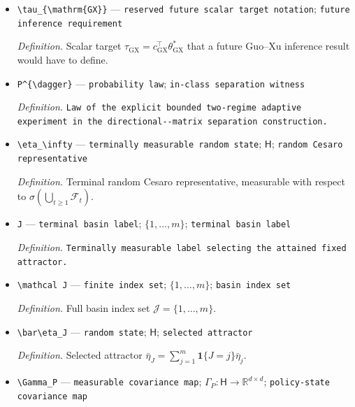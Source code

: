 \documentclass{article}
\begin{document}
\begin{itemize}
  \item \texttt{\textbackslash{}\allowbreak{}tau\_\allowbreak{}\{\textbackslash{}\allowbreak{}mathrm\{GX\}\allowbreak{}\}\allowbreak{}} --- \texttt{reserved future scalar target notation}; \texttt{future inference requirement}
  \par\smallskip\noindent\emph{Definition.} Scalar target \(\tau_{\mathrm{GX}}=c_{\mathrm{GX}}^\top\theta^*_{\mathrm{GX}}\) that a future Guo--Xu inference result would have to define.
  \item \texttt{P\textasciicircum{}\{\textbackslash{}\allowbreak{}dagger\}\allowbreak{}} --- \texttt{probability law}; \texttt{in-\allowbreak{}class separation witness}
  \par\smallskip\noindent\emph{Definition.} \texttt{Law of the explicit bounded two-\allowbreak{}regime adaptive experiment in the directional-\allowbreak{}-\allowbreak{}matrix separation construction.}
  \item \texttt{\textbackslash{}\allowbreak{}eta\_\allowbreak{}\textbackslash{}\allowbreak{}infty} --- \texttt{terminally measurable random state}; \(\mathsf H\); \texttt{random Cesaro representative}
  \par\smallskip\noindent\emph{Definition.} Terminal random Cesaro representative, measurable with respect to \(\sigma(\bigcup_{t\ge1}\mathcal F_t)\).
  \item \texttt{J} --- \texttt{terminal basin label}; \(\{1,\ldots,m\}\); \texttt{terminal basin label}
  \par\smallskip\noindent\emph{Definition.} \texttt{Terminally measurable label selecting the attained fixed attractor.}
  \item \texttt{\textbackslash{}\allowbreak{}mathcal J} --- \texttt{finite index set}; \(\{1,\ldots,m\}\); \texttt{basin index set}
  \par\smallskip\noindent\emph{Definition.} Full basin index set \(\mathcal J=\{1,\ldots,m\}\).
  \item \texttt{\textbackslash{}\allowbreak{}bar\textbackslash{}\allowbreak{}eta\_\allowbreak{}J} --- \texttt{random state}; \(\mathsf H\); \texttt{selected attractor}
  \par\smallskip\noindent\emph{Definition.} Selected attractor \(\bar\eta_J=\sum_{j=1}^m\mathbf1\{J=j\}\bar\eta_j\).
  \item \texttt{\textbackslash{}\allowbreak{}Gamma\_\allowbreak{}P} --- \texttt{measurable covariance map}; \(\Gamma_P:\mathsf H\to\mathbb R^{d\times d}\); \texttt{policy-\allowbreak{}state covariance map}

\end{itemize}
\end{document}
